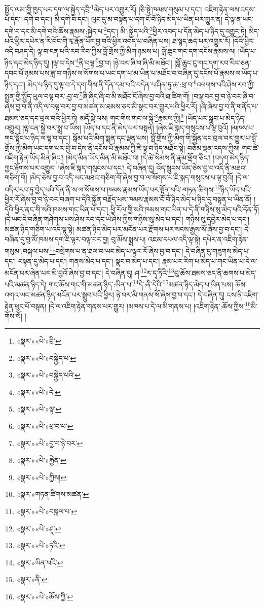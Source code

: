 སྤྱོད་ལམ་གྱི་ཁྱད་པར་དག་ལ་སྐྱེད་དབྲི་\footnote{«སྣར་»«པེ་»བྲི་}མེད་པར་འགྱུར་རོ། །ཅི་སྟེ་ཁམས་གསུམ་པ་དང་། འཇིག་རྟེན་ལས་འདས་པ་དང་། དགེ་བ་དང་། མི་དགེ་བ་དང་། ལུང་དུ་མ་བསྟན་པ་དག་ངོ་བོ་ཉིད་མེད་པ་ཡིན་པར་གྱུར་ན། དེ་ལྟ་ན་ཡང་དགེ་བ་དང་མི་དགེ་བའི་ཆོས་རྣམས་:སྐྱེད་པ་\footnote{«སྣར་»«པེ་»བསྐྱེད་པ་}དང་། མི་:སྐྱེད་པའི་\footnote{«སྣར་»«པེ་»བསྐྱེད་པའི་}ཕྱིར་འབད་པ་དོན་མེད་པ་ཉིད་དུ་འགྱུར་ཏེ། མེད་པའི་ཕྱིར་དཔེར་ན་རི་བོང་གི་རྭ་རྣོན་པོར་བྱ་བའི་ཕྱིར་འབད་པ་བཞིན་པས། ཐ་སྙད་ཆད་པར་འགྱུར་རོ། །དེའི་ཕྱིར་འདི་བཤད་དེ། ལྟ་བ་ངན་པའི་རབ་རིབ་ཀྱིས་བློ་གྲོས་ཀྱི་མིག་ཉམས་པ། བློ་ཆུང་གང་དག་དངོས་རྣམས་ལ། །ཡོད་པ་ཉིད་དང་མེད་ཉིད་དུ། །ལྟ་བ་དེས་\footnote{«སྣར་»«པེ་»དེ་}ནི་བལྟ་\footnote{«སྣར་»«པེ་»ལྟ་}བྱ་བ། །ཉེ་བར་ཞི་བ་ཞི་མི་མཐོང་། །བློ་ཆུང་ངུ་གང་དག་རབ་རིབ་ཅན་དབང་པོ་ཉམས་པས་ཟླ་བ་གཉིས་ལ་སོགས་པ་ཡང་དག་པ་མ་ཡིན་པ་མཐོང་བ་བཞིན་དུ་དངོས་པོ་རྣམས་ལ་ཡོད་པ་ཉིད་དང་། མེད་པ་ཉིད་དུ་ལྟ་བ་དེ་དག་གིས་ནི་དོན་དམ་པའི་བདེན་པ་ཤིན་ཏུ་ཆ་:ཕྲ་བ་\footnote{«སྣར་»«པེ་»ཕྲ་བ་པ་}འཕགས་པའི་ཤེས་རབ་ཀྱི་སྤྱན་གྱི་སྤྱོད་ཡུལ་བལྟ་བར་:བྱ་བ་\footnote{«སྣར་»«པེ་»བྱ་བ་ཉེ་བར་}ཞི་ཞིང་ཞི་བ་མི་མཐོང་ངོ་ཞེས་བྱ་བའི་ཐ་ཚིག་གོ། །བལྟ་བར་བྱ་བ་ཉེ་བར་ཞི་བ་ཞེས་བྱ་བ་ནི་འདི་ལ་བལྟ་བར་བྱ་བ་མཚན་མ་ཐམས་ཅད་མི་སྣང་བར་གྱུར་པའི་ཕྱིར་རོ། །ཞི་ཞེས་བྱ་བ་ནི་གནོད་པ་ཐམས་ཅད་དང་བྲལ་བའི་ཕྱིར་ཏེ། མདོ་སྡེ་ལས། གང་གིས་གང་ལ་སྐྱེ་\footnote{«སྣར་»«པེ་»རྐྱེན་}རྣམས་ཀྱི།\footnote{«སྣར་»«པེ་»ཀྱིས།} །ཡོད་པར་སྒྲུབ་པ་མེད་ཉིད་འགྱུར། །ལྟ་ངན་སྐྱེ་བར་སྨྲ་བ་ཡིས། །ཡོད་པ་དང་ནི་མེད་པར་བསྟན། །ཞེས་ཇི་སྐད་གསུངས་པ་ལྟ་བུའོ། །མཁས་པ་གང་སྟོང་པ་ཉིད་ལ་ལྟ་བ་དང་། སྒོམ་པའི་མིག་སྨན་དང་ལྡན་པས། བློ་གྲོས་ཀྱི་མིག་གི་སྐྱོན་དང་བྲལ་བར་གྱུར་པ་བློ་གྲོས་ཀྱི་མིག་ཡང་དག་པར་བྱེ་བ་དེས་ནི་དངོས་པོ་རྣམས་ཀྱི་ཇི་ལྟ་བ་ཉིད་མཐོང་སྟེ། བཅོམ་ལྡན་འདས་ཀྱིས། གང་ཚེ་འཇིག་རྟེན་ཡོད་མིན་ཞིང་། །མེད་མིན་ཡོད་མིན་མི་མཐོང་བ། །དེ་ཚེ་སེམས་ནི་རྣམ་ལྡོག་ཅིང་། །བདག་མེད་ཉིད་ཀྱང་རྟོགས་པར་འགྱུར། །ཞེས་ཇི་སྐད་གསུངས་པ་དང་། དེ་བཞིན་དུ། འོད་སྲུངས་ཡོད་ཅེས་བྱ་བ་འདི་ནི་མཐའ་གཅིག་གོ། །མེད་ཅེས་བྱ་བ་འདི་ཡང་མཐའ་གཅིག་གོ་ཞེས་བྱ་བ་ལ་སོགས་པ་ཇི་སྐད་གསུངས་པ་ལྟ་བུའོ། །དེ་ལ་འདིར་རབ་ཏུ་བྱེད་པའི་དོན་ནི་ས་ལ་སོགས་པ་ཁམས་རྣམས་ཡོད་པར་སྟོན་པའི་:གཏན་ཚིགས་\footnote{«སྣར་»གཏན་ཚིགས་མཚན་}ཉིད་ཡོད་པའི་ཕྱིར་རོ་ཞེས་བྱ་བ་ཉེ་བར་བཞག་པ་དེའི་སྐྱོན་བརྗོད་པས་ཁམས་རྣམས་ངོ་བོ་ཉིད་མེད་པ་ཉིད་དུ་བསྟན་པ་ཡིན་ནོ། །དེའི་ཕྱིར་ནང་གི་སའི་ཁམས་གང་ཡིན་པ་དང་། ཕྱི་རོལ་གྱི་སའི་ཁམས་གང་ཡིན་པ་དེ་ནི་གཉིས་སུ་མེད་པའི་དོན་ཏོ། །དེ་ཡང་དེ་བཞིན་གཤེགས་པས་ཤེས་རབ་དང་ཡེ་ཤེས་ཀྱིས་གཉིས་སུ་མེད་པ་དང་། གཉིས་སུ་དབྱེར་མེད་པ་དང་། མཚན་ཉིད་གཅིག་པ་འདི་ལྟ་སྟེ། མཚན་ཉིད་མེད་པར་མངོན་པར་རྫོགས་པར་སངས་རྒྱས་སོ་ཞེས་བྱ་བ་དང་། དེ་བཞིན་དུ་བུ་མོ་ཁམས་དག་ཇི་ལྟར་བལྟ་བར་བྱ། བུ་མོས་སྨྲས་པ། འཇམ་དཔལ་འདི་ལྟ་སྟེ། དཔེར་ན་འཇིག་རྟེན་གསུམ་:བསྐལ་པས་\footnote{«སྣར་»«པེ་»བསྐལ་པ་}བསྲེགས་པ་ན་ཐལ་བ་ཡང་མེད་པ་ལྟར་རོ་ཞེས་བྱ་བ་དང་། དེ་བཞིན་དུ་གཟུགས་མེད་པ་དང་། བསྟན་དུ་མེད་པ་དང་། གནས་མེད་པ་དང་། སྣང་བ་མེད་པ་དང་། རྣམ་པར་རིག་པ་མེད་པ་གང་ཡིན་པ་དེ་ལ་མངོན་པར་ཞེན་པར་མི་བྱའོ་ཞེས་བྱ་བ་དང་། དེ་བཞིན་དུ། ཤ་\footnote{«སྣར་»«པེ་»ཤཱ་}ར་དྭ་ཏིའི་\footnote{«སྣར་»«པེ་»ཏའི་}བུ་ཆོས་ཐམས་ཅད་ནི་ཆགས་པ་མེད་པའི་མཚན་ཉིད་དེ། གང་ཆོས་གང་གི་མཚན་ཉིད་:ཡིན་པ་\footnote{«སྣར་»ཡིན་པའི་}དེ་:ནི་དེའི་\footnote{«སྣར་»ནི་}མཚན་ཉིད་མེད་པ་ཡིན་པས། ཆོས་འགའ་ཡང་མཚན་ཉིད་མངོན་པར་སྒྲུབ་པའི་ཕྱིར། ཉེ་བར་མི་གནས་སོ་ཞེས་བྱ་བ་དང་། དེ་བཞིན་དུ། ངས་ནི་འཇིག་རྟེན་ཕུང་པོ་བསྟན། །དེ་ལ་འཇིག་རྟེན་གནས་པར་གྱུར། །མཁས་པ་དེ་ལ་མི་གནས་པ། །འཇིག་རྟེན་:ཆོས་ཀྱིས་\footnote{«སྣར་»«པེ་»ཆོས་ཀྱི་}མི་གོས་སོ། །
